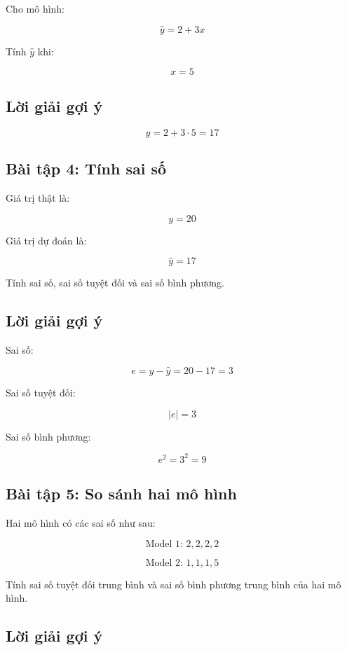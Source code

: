Cho mô hình:

\[
    \hat{y}=2+3x
\]

Tính $\hat{y}$ khi:

\[
    x=5
\]

\subsection*{Lời giải gợi ý}

\[
    \hat{y}=2+3\cdot5=17
\]

\subsection*{Bài tập 4: Tính sai số}

Giá trị thật là:

\[
    y=20
\]

Giá trị dự đoán là:

\[
    \hat{y}=17
\]

Tính sai số, sai số tuyệt đối và sai số bình phương.

\subsection*{Lời giải gợi ý}

Sai số:

\[
    e=y-\hat{y}=20-17=3
\]

Sai số tuyệt đối:

\[
    |e|=3
\]

Sai số bình phương:

\[
    e^2=3^2=9
\]

\subsection*{Bài tập 5: So sánh hai mô hình}

Hai mô hình có các sai số như sau:

\[
    \text{Model 1: } 2,2,2,2
\]

\[
    \text{Model 2: } 1,1,1,5
\]

Tính sai số tuyệt đối trung bình và sai số bình phương trung bình của hai mô hình.

\subsection*{Lời giải gợi ý}

